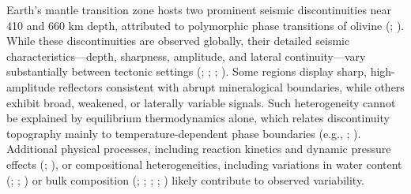 \documentclass[
  paper=a4,
  ,captions=tableheading
]{scrartcl}
\begin{document}
Earth's mantle transition zone hosts two prominent seismic
discontinuities near 410 and 660 km depth, attributed to polymorphic
phase transitions of olivine (; ). While these
discontinuities are observed globally, their detailed seismic
characteristics---depth, sharpness, amplitude, and lateral
continuity---vary substantially between tectonic settings
(; ; ; ). Some
regions display sharp, high-amplitude reflectors consistent with abrupt
mineralogical boundaries, while others exhibit broad, weakened, or
laterally variable signals. Such heterogeneity cannot be explained by
equilibrium thermodynamics alone, which relates discontinuity topography
mainly to temperature-dependent phase boundaries (e.g.,
;
). Additional physical
processes, including reaction kinetics and dynamic pressure effects
(;
), or compositional
heterogeneities, including variations in water content
(;
; ) or bulk composition (; ;
;
;
) likely contribute to
observed variability.
\end{document}
